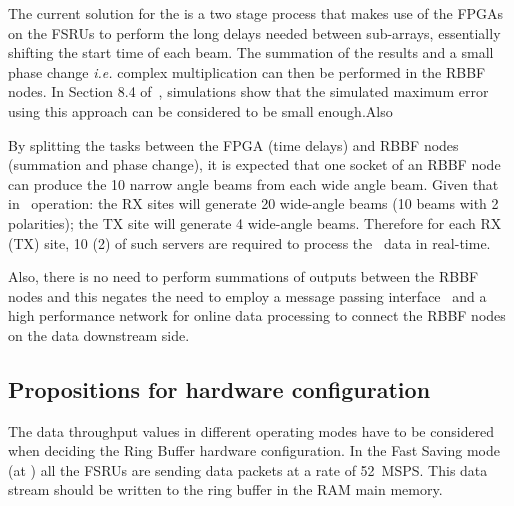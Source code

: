 \documentclass[12pt,a4paper]{article}
\begin{document}
The current solution for the \SBF is a two stage process that makes use of the FPGAs on the FSRUs to perform the long delays needed between sub-arrays, essentially shifting the start time of each beam.
The summation of the results and a small phase change \emph{i.e.} complex multiplication can then be performed in the RBBF nodes.
In Section 8.4 of~\cite{e3dds-do2}, simulations show that the simulated maximum error using this approach can be considered to be small enough.Also

By splitting the \SBF tasks between the \fsru FPGA (time delays) and RBBF nodes (summation and phase change), it is expected that one socket of an RBBF node~\cite{amd-epyc} can produce the 10 narrow angle beams from each wide angle beam.
Given that in \NBW\ operation: the RX sites will generate 20 wide-angle beams (10 beams with 2 polarities); the TX site will generate 4 wide-angle beams.
Therefore for each RX (TX) site, 10 (2) of such servers are required to process the \NBW\ data in real-time.

Also, there is no need to perform summations of outputs between the RBBF nodes and this negates the need to employ a message passing interface~\cite{mpi} and a high performance network for online data processing to connect the RBBF nodes on the data downstream side.


\subsection{Propositions for hardware configuration}
\label{ssec:prop-hw}

The data throughput values in different operating modes have to be considered when deciding the Ring Buffer hardware configuration.
In the Fast Saving mode (at \WBW) all the FSRUs are sending data packets at a rate of 52~MSPS. 
This data stream should be written to the ring buffer in the RAM main memory. 
\end{document}
